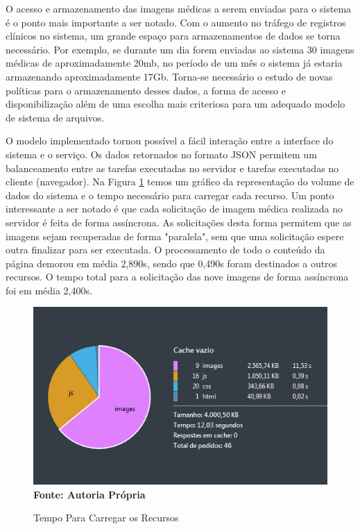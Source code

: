 O acesso e armazenamento das imagens médicas a serem enviadas para o sistema é o ponto mais importante a ser notado. Com o aumento no tráfego de registros clínicos no sistema, um grande espaço para armazenamentos de dados se torna necessário. Por exemplo, se durante um dia forem enviadas ao sistema 30 imagens médicas de aproximadamente 20mb, no período de um mês o sistema já estaria armazenando aproximadamente 17Gb. Torna-se necessário o estudo de novas políticas para o armazenamento desses dados, a forma de acesso e disponibilização além de uma escolha mais criteriosa para um adequado modelo de sistema de arquivos.

O modelo implementado tornou possível a fácil interação entre a interface do sistema e o serviço. Os dados retornados no formato JSON permitem um balanceamento entre as tarefas executadas no servidor e tarefas executadas no cliente (navegador). Na Figura \ref{fig:figura5} temos um gráfico da representação do volume de dados do sistema e o tempo necessário para carregar cada recurso. Um ponto interessante a ser notado é que cada solicitação de imagem médica realizada no servidor é feita de forma assíncrona. As solicitações desta forma permitem que as imagens sejam recuperadas de forma "paralela", sem que uma solicitação espere outra finalizar para ser executada. O processamento de todo o conteúdo da página demorou em média 2,890s, sendo que 0,490s foram destinados a outros recursos. O tempo total para a solicitação das nove imagens de forma assíncrona foi em média 2,400s.


\begin{figure}[ht]
	\centering	
	\caption[\hspace{0.1cm}Imagens Clínicas.]{Tempo Para Carregar os Recursos}
	\vspace{-0.4cm}
	\includegraphics[width=1.0\textwidth]{figuras/analiseTempoIndividualParaCarregarImagens.png}
	\vspace{-0.2cm}
	\\\textbf{\footnotesize Fonte: Autoria Própria }
	\label{fig:figura5}
\end{figure}


